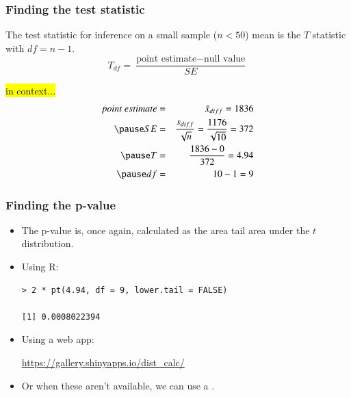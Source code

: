 \begin{frame}
\frametitle{Finding the test statistic}

{The test statistic for inference on a small sample ($n < 50$) mean is the $T$ statistic with $df = n - 1$.
\[ T_{df} = \frac{\text{point estimate} - \text{null value}}{SE} \]}

\pause

\vspace{-0.5cm}

\hl{in context...}
\begin{eqnarray*}
point~estimate &=& \bar{x}_{diff} = 1836 \\
\pause
SE &=& \frac{s_{diff}}{\sqrt{n}} = \frac{1176}{\sqrt{10}} = 372 \\
\pause
T &=& \frac{1836 - 0}{372} = 4.94 \\
\pause
df &=& 10 - 1 = 9
\end{eqnarray*}


\end{frame}


\begin{frame}[fragile]
\frametitle{Finding the p-value}

\begin{itemize}

\item The p-value is, once again, calculated as the area tail area under the $t$ distribution.

\pause

\item Using R:
\begin{verbatim}
> 2 * pt(4.94, df = 9, lower.tail = FALSE)

[1] 0.0008022394
\end{verbatim}

\pause

\item Using a web app:

\href{https://gallery.shinyapps.io/dist_calc/}{\textcolor{oiB}{https://gallery.shinyapps.io/dist\_calc/}}

\pause

\item Or when these aren't available, we can use a .

\end{itemize}

\end{frame}

